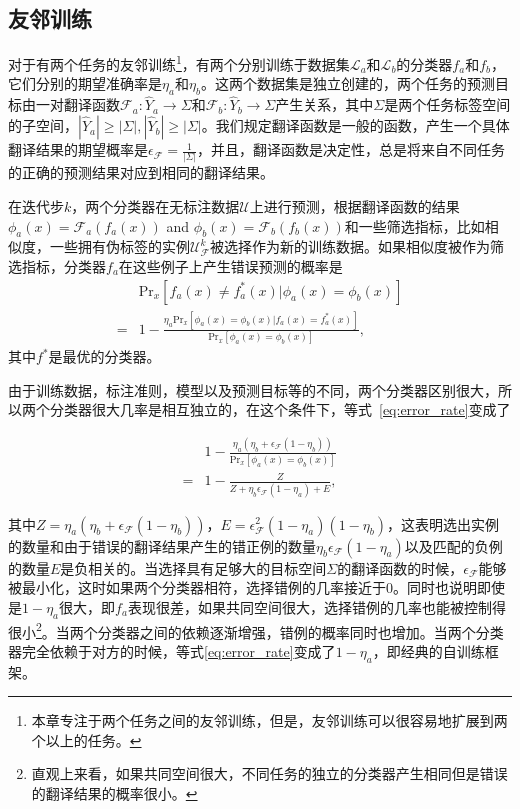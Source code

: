 \subsection{友邻训练}\label{sec:fdt}
对于有两个任务的友邻训练\footnote{本章专注于两个任务之间的友邻训练，但是，友邻训练可以很容易地扩展到两个以上的任务。}，有两个分别训练于数据集$\mathcal{L}_a$和$\mathcal{L}_b$的分类器$f_a$和$f_b$，它们分别的期望准确率是$\eta_a$和$\eta_b$。这两个数据集是独⽴创建的，两个任务的预测⽬标由⼀对翻译函数$\mathcal{F}_a: \hat{Y}_a \rightarrow \Sigma$和$\mathcal{F}_b: \hat{Y}_b \rightarrow \Sigma$产生关系，其中$\Sigma$是两个任务标签空间的子空间，$|\hat{Y}_a| \ge |\Sigma|, |\hat{Y}_b| \ge |\Sigma|$。我们规定翻译函数是一般的函数，产生一个具体翻译结果的期望概率是$\epsilon_{\mathcal{F}} = \frac{1}{|\Sigma|}$，并且，翻译函数是决定性，总是将来自不同任务的正确的预测结果对应到相同的翻译结果。

在迭代步$k$，两个分类器在无标注数据$\mathcal{U}$上进行预测，根据翻译函数的结果$\phi_a(x) =\mathcal{F}_a(f_a(x))$ and $\phi_b(x) =\mathcal{F}_b(f_b(x))$和一些筛选指标，比如相似度，一些拥有伪标签的实例$\mathcal{U}_\mathcal{F}^k$被选择作为新的训练数据。如果相似度被作为筛选指标，分类器$f_a$在这些例子上产生错误预测的概率是
\begin{align}
    &\mathrm{Pr}_{x} [f_a(x) \ne f^*_a(x)| \mathcal{\phi}_a(x) = \mathcal{\phi}_b(x)] \nonumber\\
     =& 1- \frac{\eta_a \mathrm{Pr}_{x} [ \mathcal{\phi}_a(x) = \mathcal{\phi}_b(x) | f_a(x) = f^*_a(x)] }{\mathrm{Pr}_{x} [\mathcal{\phi}_a(x) = \mathcal{\phi}_b(x)]},
\label{eq:error_rate}
\end{align}
其中$f^*$是最优的分类器。

由于训练数据，标注准则，模型以及预测目标等的不同，两个分类器区别很大，所以两个分类器很大几率是相互独立的，在这个条件下，等式~\ref{eq:error_rate}变成了

\begin{align}\label{eq:match_prob}
& 1- \frac{\eta_a (\eta_b + \epsilon_{\mathcal{F}} (1 - \eta_b) ) }{\mathrm{Pr}_{x} [\mathcal{\phi}_a(x) = \mathcal{\phi}_b(x)]} \nonumber \\
= & 1- \frac{Z}{Z + \eta_b\epsilon_{\mathcal{F}} (1 - \eta_a) + E},
\end{align}

其中$Z=\eta_a (\eta_b + \epsilon_{\mathcal{F}} (1 - \eta_b) )$，$E = \epsilon_\mathcal{F}^2(1-\eta_a)(1-\eta_b)$，这表明选出实例的数量和由于错误的翻译结果产生的错正例的数量$\eta_b\epsilon_{\mathcal{F}} (1 - \eta_a)$以及匹配的负例的数量$E$是负相关的。当选择具有足够大的目标空间$\Sigma$的翻译函数的时候，$\epsilon_\mathcal{F}$能够被最小化，这时如果两个分类器相符，选择错例的几率接近于0。同时也说明即使是$1-\eta_a$很大，即$f_a$表现很差，如果共同空间很大，选择错例的几率也能被控制得很小\footnote{直观上来看，如果共同空间很大，不同任务的独立的分类器产生相同但是错误的翻译结果的概率很小。}。当两个分类器之间的依赖逐渐增强，错例的概率同时也增加。当两个分类器完全依赖于对方的时候，等式\ref{eq:error_rate}变成了$1-\eta_a$，即经典的自训练框架。

